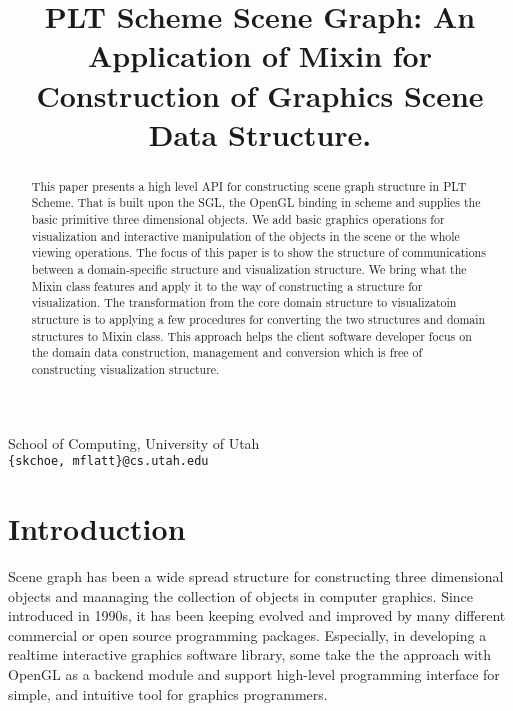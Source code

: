 \documentclass[preprint,nocopyrightspace]{sigplanconf}
\begin{document}
\title{
PLT Scheme Scene Graph: An Application of Mixin for Construction of Graphics
Scene Data Structure.}

           {School of Computing, University of Utah\\
             \texttt{\{skchoe, mflatt\}@cs.utah.edu}}

\maketitle

\begin{abstract}
This paper presents a high level API for constructing scene graph structure in
PLT Scheme. That is built upon the SGL, the OpenGL binding in scheme and
supplies the basic primitive three dimensional objects. We add basic graphics
operations for visualization and interactive manipulation of the objects in
the scene or the whole viewing operations. The focus of this paper is to show
the structure of communications between a domain-specific structure and
visualization structure. We bring what the Mixin class features and apply it
to the way of constructing a structure for visualization. The transformation
from the core domain structure to visualizatoin structure is to applying a few
procedures for converting the two structures and domain structures to Mixin
class. This approach helps the client software developer focus on the domain
data construction, management and conversion which is free of constructing
visualization structure. 
\end{abstract}

\section{Introduction}
\label{intro}
 Scene graph\cite{Scenegraph} has been a wide spread structure for
 constructing three dimensional objects and maanaging the collection of objects in computer
 graphics. Since introduced in 1990s, it has been keeping evolved and improved
 by many different commercial or open source programming packages. Especially,
 in developing a realtime interactive graphics software library, some take the
 the approach with OpenGL\cite{OpenGL} as a backend module
 and support high-level programming interface for simple, and intuitive tool for graphics programmers.
\end{document}
